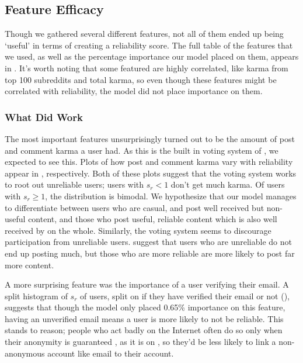 
\subsection{Feature Efficacy} %
\label{sub:feature_efficacy}

Though we gathered several different features, not all of them ended up being
`useful' in terms of creating a reliability score. The full table of the
features that we used, as well as the percentage importance our model placed on
them, appears in . It's worth noting that some featured are
highly correlated, like karma from top 100 subreddits and total karma, so even
though these features might be correlated with reliability, the model did not
place importance on them.

\subsubsection{What Did Work} %
\label{ssub:what_did_work}

The most important features unsurprisingly turned out to be the amount of post
and comment karma a user had. As this is the built in voting system of
\reddit{}, we expected to see this. Plots of how post and comment karma vary
with reliability appear in
, respectively.
Both of these plots suggest that the voting system works to root out unreliable
users; users with $s_r < 1$ don't get much karma. Of users with $s_r \geq 1$,
the distribution is bimodal. We hypothesize that our model manages to
differentiate between users who are casual, and post well received but non-
useful content, and those who post useful, reliable content which is also well
received by \reddit{} on the whole. Similarly, the voting system seems to
discourage participation from unreliable users.
 suggest that
users who are unreliable do not end up posting much, but those who are more
reliable are more likely to post far more content.

A more surprising feature was the importance of a user verifying their email. A
split histogram of $s_r$ of users, split on if they have verified their email or
not (), suggests that though the model only placed
0.65\% importance on this feature, having an unverified email means a user is
more likely to not be reliable. This stands to reason; people who act badly on
the Internet often do so only when their anonymity is guaranteed
\cite{cho1999privacy}, as it is on \reddit{}, so they'd be less likely to link a
non-anonymous account like email to their \reddit{} account.

